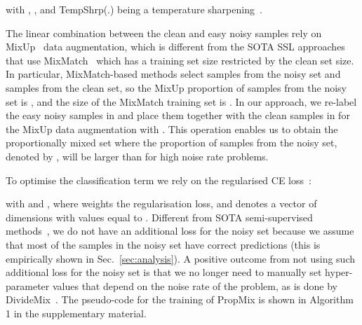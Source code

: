 \documentclass{bmvc2k}
\begin{document}
with  ,  
 , and TempShrp(.) being a temperature sharpening~\citep{DivideMix}.


The linear combination between the clean and easy noisy samples rely on MixUp~\citep{mixup} data augmentation, which is different from the
SOTA SSL approaches~\citep{DivideMix} that use MixMatch~\citep{MixMatch} which has a training set size restricted by the clean set size. 
In particular, MixMatch-based methods select  samples from the noisy set and  samples from the clean set, so the MixUp proportion of samples from the noisy set is , and the size of the MixMatch training set is . 
In our approach, we re-label the easy noisy samples in  and place them together with the clean samples in  for the MixUp data augmentation with .  This operation enables us to obtain the proportionally mixed set  where the proportion of samples from the noisy set, denoted by , will be larger than  for high noise rate problems. 

To optimise the classification term we rely on the regularised CE loss~\citep{DivideMix}:

with  
 and 
,  
where  weights the regularisation loss, and  denotes a vector of  dimensions with values equal to . 
Different from SOTA semi-supervised methods~\citep{DivideMix,AugDesc}, we do not have an additional loss for the noisy set because we assume that most of the samples in the noisy set have correct predictions (this is empirically shown in Sec.~\ref{sec:analysis}). 
A positive outcome from not using such additional loss for the noisy set is that we no longer need to manually set hyper-parameter values that depend on the noise rate of the problem, as is done by DivideMix~\citep{DivideMix}.
The pseudo-code for the training of PropMix is shown in Algorithm 1 in the supplementary material.  
















 
 






                
                
                




        
        
\end{document}
